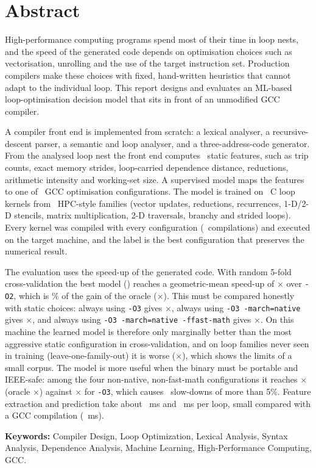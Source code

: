 \section*{Abstract}

High-performance computing programs spend most of their time in loop nests, and
the speed of the generated code depends on optimisation choices such as
vectorisation, unrolling and the use of the target instruction set. Production
compilers make these choices with fixed, hand-written heuristics that cannot
adapt to the individual loop. This report designs and evaluates an
ML-based loop-optimisation decision model that sits in front of an unmodified
GCC compiler.

A compiler front end is implemented from scratch: a lexical analyser, a
recursive-descent parser, a semantic and loop analyser, and a three-address-code
generator. From the analysed loop nest the front end computes \numFeatures\
static features, such as trip counts, exact memory strides, loop-carried
dependence distance, reductions, arithmetic intensity and working-set size. A
supervised model maps the features to one of \numConfigs\ GCC optimisation
configurations. The model is trained on \numKernels\ C loop kernels from
\numFamilies\ HPC-style families (vector updates, reductions, recurrences,
1-D/2-D stencils, matrix multiplication, 2-D traversals, branchy and strided
loops). Every kernel was compiled with every configuration (\numCompiles\
compilations) and executed on the target machine, and the label is the best
configuration that preserves the numerical result.

The evaluation uses the speed-up of the generated code. With random 5-fold
cross-validation the best model (\selModel) reaches a geometric-mean speed-up of
\selGMCV$\times$ over \texttt{-O2}, which is \selFracCV\% of the gain of the oracle
(\oracleGM$\times$). This must be compared honestly with static choices: always using
\texttt{-O3} gives \gmOThree$\times$, always using \texttt{-O3 -march=native} gives
\gmONative$\times$, and always using \texttt{-O3 -march=native -ffast-math} gives
\gmOFast$\times$. On this machine the learned model is therefore only marginally better
than the most aggressive static configuration in cross-validation, and on loop families
never seen in training (leave-one-family-out) it is worse (\selGMLOFO$\times$), which shows the
limits of a small corpus. The model is more useful when the binary must be portable and
IEEE-safe: among the four non-native, non-fast-math configurations it reaches \pCV$\times$
(oracle \pOracle$\times$) against \pOThree$\times$ for \texttt{-O3}, which causes \pOThreeSlow\
slow-downs of more than 5\%. Feature extraction and prediction take about \featMs\ ms and
\predMs\ ms per loop, small compared with a GCC compilation (\gccCompileMs\ ms).

\textbf{Keywords:}
Compiler Design, Loop Optimization, Lexical Analysis, Syntax Analysis,
Dependence Analysis, Machine Learning, High-Performance Computing, GCC.
